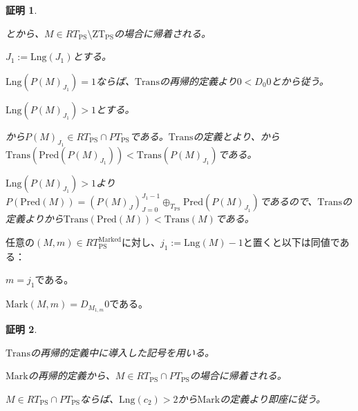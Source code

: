 \documentclass[dvipdfmx,uplatex]{jsarticle}
\theoremstyle{customnonumberbreakfortheorem}
\theoremstyle{customnonumberbreakforproof}
\newtheorem{hideableproof}{証明}
\begin{document}
\begin{hideableproof}
	\begin{indented}
		\item {}とから、\(M \in RT_{\textrm{PS}} \setminus \textrm{ZT}_{\textrm{PS}}\)の場合に帰着される。
		\item \(J_1 := \textrm{Lng}(J_1)\)とする。
		\begin{indented}
			\item \(\textrm{Lng}(P(M)_{J_1}) = 1\)ならば、\(\textrm{Trans}\)の再帰的定義より\(0 < D_0 0\)とから従う。
			\item \(\textrm{Lng}(P(M)_{J_1}) > 1\)とする。
			\begin{indented}
				\item {}から\(P(M)_{J_1} \in RT_{\textrm{PS}} \cap PT_{\textrm{PS}}\)である。\(\textrm{Trans}\)の定義とより、から\(\textrm{Trans}(\textrm{Pred}(P(M)_{J_1})) < \textrm{Trans}(P(M)_{J_1})\)である。
				\item \(\textrm{Lng}(P(M)_{J_1}) > 1\)より\(P(\textrm{Pred}(M)) = (P(M)_J)_{J=0}^{J_1-1} \oplus_{T_{\textrm{PS}}} \textrm{Pred}(P(M)_{J_1})\)であるので、\(\textrm{Trans}\)の定義よりから\(\textrm{Trans}(\textrm{Pred}(M)) < \textrm{Trans}(M)\)である。
			\end{indented}
		\end{indented}
	\end{indented}
\end{hideableproof}

\begin{proposition}\label{右端第1基点のMarkの基本性質}
	任意の\((M,m) \in RT_{\textrm{PS}}^{\textrm{Marked}}\)に対し、\(j_1 := \textrm{Lng}(M) - 1\)と置くと以下は同値である：
	\begin{penumerate}
		\item \(m = j_1\)である。
		\item \(\textrm{Mark}(M,m) = D_{M_{1,m}} 0\)である。
	\end{penumerate}
\end{proposition}

\begin{hideableproof}
	\begin{indented}
		\item \(\textrm{Trans}\)の再帰的定義中に導入した記号を用いる。
		\item \(\textrm{Mark}\)の再帰的定義から、\(M \in RT_{\textrm{PS}} \cap PT_{\textrm{PS}}\)の場合に帰着される。
		\item \(M \in RT_{\textrm{PS}} \cap PT_{\textrm{PS}}\)ならば、\(\textrm{Lng}(c_2) > 2\)から\(\textrm{Mark}\)の定義より即座に従う。
	\end{indented}
\end{hideableproof}
\end{document}
